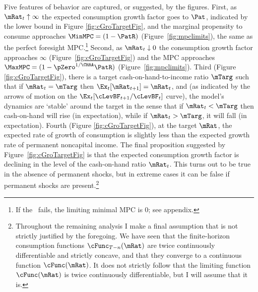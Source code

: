 \documentclass[BufferStockTheory]{subfiles}
\begin{document}
Five features of behavior are captured, or suggested, by the
figures. First, as $\mRat_{t} \uparrow \infty$ the expected
consumption growth factor goes to ${\Pat}$, indicated by the lower
bound in Figure \ref{fig:cGroTargetFig}, and the marginal propensity
to consume approaches $\MinMPC=(1-\PatR)$
(Figure~\ref{fig:mpclimits}), the same as the perfect foresight MPC.\footnote{If the \RIC~fails, the limiting minimal MPC is 0; see appendix.}  Second, as $\mRat_t \downarrow 0$ the consumption
growth factor approaches $\infty$ (Figure~\ref{fig:cGroTargetFig}) and
the MPC approaches $\MaxMPC=(1-\pZero^{1/\CRRA}\PatR)$ (Figure~\ref{fig:mpclimits}).  Third (Figure
\ref{fig:cGroTargetFig}), there is a target cash-on-hand-to-income
ratio $\mTarg$ such that if $\mRat_t = \mTarg$ then $\Ex_t [
{\mRat}_{t+1}] = \mRat_t$, and (as indicated by the arrows of motion
on the $\Ex_{t}[\cLevBF_{t+1}/\cLevBF_{t}]$ curve), the model's dynamics
are `stable' around the target in the sense that if $\mRat_{t} <
\mTarg$ then cash-on-hand will rise (in expectation), while if
$\mRat_{t} > \mTarg$, it will fall (in expectation).  Fourth (Figure
\ref{fig:cGroTargetFig}), at the target $\mRat$, the expected rate of
growth of consumption is slightly less than the expected growth rate
of permanent noncapital income. The final proposition suggested by
Figure~\ref{fig:cGroTargetFig} is that the expected consumption growth
factor is declining in the level of the cash-on-hand ratio
$\mRat_{t}$.  This turns out to be true in the absence of permanent
shocks, but in extreme cases it can be false if permanent shocks are
present.\footnote{Throughout the remaining analysis I make a final
  assumption that is not strictly justified by the foregoing.  We have
  seen that the finite-horizon consumption functions
  $\cFunc_{T-n}(\mRat)$ are twice continuously differentiable and
  strictly concave, and that they converge to a continuous function
  $\cFunc(\mRat)$.  It does not strictly follow that the limiting
  function $\cFunc(\mRat)$ is twice continuously differentiable, but I
  will assume that it is.}

\renewcommand{\figFile}{cGroTargetFig}
\hypertarget{\figFile}{}

\end{document}
